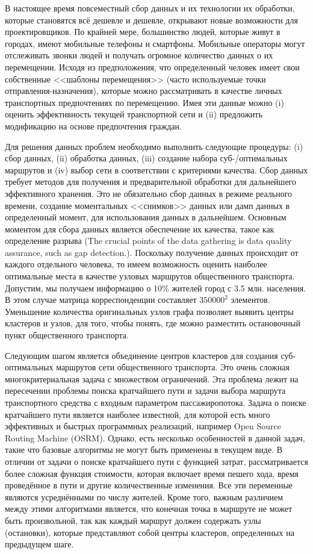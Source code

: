 В настоящее время повсеместный сбор данных и их технологии их обработки, которые становятся всё дешевле и 
дешевле, открывают новые возможности для проектировщиков. По крайней мере, большинство людей, которые 
живут в городах, имеют мобильные телефоны и смартфоны. Мобильные операторы могут отслеживать звонки людей 
и получать огромное количество данных о их перемещении. Исходя из предположения, что определенный человек 
имеет свои собственные <<шаблоны перемещения>> (часто используемые точки отправления-назначения), которые 
можно рассматривать в качестве личных транспортных предпочтениях по перемещению. Имея эти данные можно (i) 
оценить эффективность текущей транспортной сети и (ii) предложить модификацию на основе предпочтения 
граждан.

Для решения данных проблем необходимо выполнить следующие процедуры: (i) сбор данных, (ii) обработка данных, 
(iii) создание набора суб-/оптимальных маршрутов и (iv) выбор сети в соответствии с критериями качества.
Сбор данных требует методов для получения и предварительной обработки для дальнейшего эффективного хранения.
Это не обязательно сбор данных в режиме реального времени, создание моментальных <<снимков>> данных или 
дамп данных в определенный момент, для использования данных в дальнейшем. Основным моментом для сбора 
данных является обеспечение их качества, такое как определение разрыва (The crucial points of the data 
gathering is data quality assurance, such as gap detection.). Поскольку получение данных происходит от 
каждого отдельного человека, то имеем возможность оценить наиболее оптимальные места в качестве узловых 
маршрутов общественного транспорта. Допустим, мы получаем информацию о 10\% жителей город с 3.5 млн. 
населения. В этом случае матрица корреспонденции составляет \( 350 000^2 \) элементов. Уменьшение количества 
оригинальных узлов графа позволяет выявить центры кластеров и узлов, для того, чтобы понять, где можно 
разместить остановочный пункт общественного транспорта.

Следующим шагом является объединение центров кластеров для создания суб- оптимальных маршрутов сети 
общественного транспорта. Это очень сложная многокритериальная задача с множеством ограничений. Эта проблема 
лежит на пересечении проблемы поиска кратчайшего пути и задачи выбора маршрута транспортного средства с 
входным параметром пассажиропотока. Задача о поиске кратчайшего пути является наиболее известной, для которой 
есть много эффективных и быстрых программных реализаций, например Open Source Routing Machine (OSRM). Однако, 
есть несколько особенностей в данной задач, такие что базовые алгоритмы не могут быть применены в текущем 
виде. В отличии от задачи о поиске кратчайшего пути с функцией затрат, рассматривается более сложная функция 
стоимости, которая включает время пешего хода, время проведённое в пути и другие количественные изменения. 
Все эти переменные являются усреднёнными по числу жителей. Кроме того, важным различием между этими 
алгоритмами является, что конечная точка в маршруте не может быть произвольной, так как каждый маршрут должен 
содержать узлы (остановки), которые представляют собой центры кластеров, определенных на предыдущем шаге.

